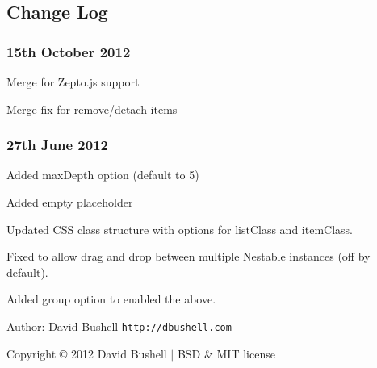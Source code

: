 \subsection*{Change Log}

\subsubsection*{15th October 2012}


\begin{DoxyItemize}
\item Merge for Zepto.\+js support
\item Merge fix for remove/detach items
\end{DoxyItemize}

\subsubsection*{27th June 2012}


\begin{DoxyItemize}
\item Added {\ttfamily max\+Depth} option (default to 5)
\item Added empty placeholder
\item Updated C\+SS class structure with options for {\ttfamily list\+Class} and {\ttfamily item\+Class}.
\item Fixed to allow drag and drop between multiple Nestable instances (off by default).
\item Added {\ttfamily group} option to enabled the above.
\end{DoxyItemize}





Author\+: David Bushell \href{http://dbushell.com/}{\tt http\+://dbushell.\+com} \href{http://twitter.com/dbushell/}{\tt }

Copyright © 2012 David Bushell $\vert$ B\+SD \& M\+IT license 